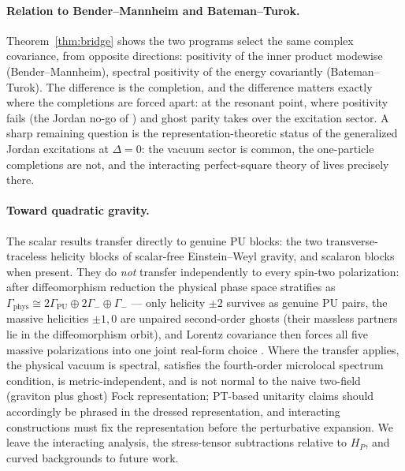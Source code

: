 \documentclass[11pt]{article}
\theoremstyle{definition}
\theoremstyle{remark}
\begin{document}
\paragraph{Relation to Bender--Mannheim and Bateman--Turok.}
Theorem~\ref{thm:bridge} shows the two programs select the same complex
covariance,
from opposite directions: positivity of the inner product modewise
(Bender--Mannheim), spectral positivity of the energy covariantly
(Bateman--Turok).  The difference is the completion, and the difference
matters exactly where the completions are forced apart: at the resonant
point, where positivity fails (the Jordan no-go of \cite{companion1}) and
ghost parity takes over the excitation sector.  A sharp remaining
question is the representation-theoretic status of the generalized Jordan
excitations at $\Delta=0$: the vacuum sector is common, the one-particle
completions are not, and the interacting perfect-square theory of
\cite{BT2026} lives precisely there.

\paragraph{Toward quadratic gravity.}
The scalar results transfer directly to genuine PU blocks: the two
transverse-traceless helicity blocks of scalar-free Einstein--Weyl
gravity, and scalaron blocks when present.  They do \emph{not} transfer
independently to every spin-two polarization: after diffeomorphism
reduction the physical phase space stratifies as
$\Gamma_{\mathrm{phys}}\cong2\Gamma_{\mathrm{PU}}\oplus2\Gamma_-
\oplus\Gamma_-$ --- only helicity $\pm2$ survives as genuine PU pairs,
the massive helicities $\pm1,0$ are unpaired second-order ghosts
(their massless partners lie in the diffeomorphism orbit), and Lorentz
covariance then forces all five massive polarizations into one joint
real-form choice \cite{companion4}.  Where the transfer applies, the
physical vacuum is spectral, satisfies the fourth-order microlocal
spectrum condition, is metric-independent, and is not normal to the
naive two-field (graviton plus ghost) Fock representation; PT-based
unitarity claims should accordingly be phrased in the dressed
representation, and interacting constructions must fix the
representation before the perturbative expansion.  We leave the
interacting analysis, the stress-tensor subtractions relative to $H_P$,
and curved backgrounds to future work.
\end{document}
